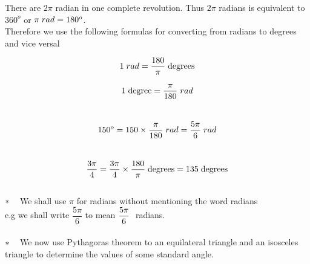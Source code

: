 \documentclass[11pt,a4paper]{article}
\begin{document}
There are $2\pi$ radian in one complete revolution. Thus $2\pi$ radians is equivalent to $360^o$ or $\pi \hspace{0.1cm} rad = 180^o$.\\

Therefore we use the following formulas for converting from radians to degrees and vice versal

$$1\hspace{0.1cm} rad = \dfrac{180}{\pi}\hspace{0.1cm}\text{degrees}$$

$$1\hspace{0.1cm}\text{degree} = \dfrac{\pi}{180}\hspace{0.1cm} rad$$\\




$$150^o = 150 \times \dfrac{\pi}{180}\hspace{0.1cm}rad = \dfrac{5\pi}{6}\hspace{0.1cm}rad$$\\

$$\dfrac{3\pi}{4} = \dfrac{3\pi}{4}\times \dfrac{180}{\pi}\hspace{0.1cm}\text{degrees} = 135\hspace{0.1cm}\text{degrees}$$\\








$*\hspace{0.3cm}$ We shall use $\pi$ for radians without mentioning the word radians\\

e.g we shall write $\dfrac{5\pi}{6}$ to mean $\dfrac{5\pi}{6}\hspace{0.1cm}$ radians.\\\\

$*\hspace{0.3cm}$ We now use Pythagoras theorem to an equilateral triangle and an isosceles triangle to determine the values of some standard angle.

\begin{figure}[H]
\centering
{}
\end{figure}
\end{document}

